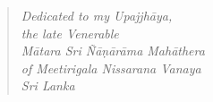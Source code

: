\cleartorecto
\thispagestyle{empty}

\mbox{}\vfill

\begin{verse}

{\itshape
Dedicated to my Upajjhāya,\\
the late Venerable\\
Mātara Sri Ñāṇārāma Mahāthera\\
of Meetirigala Nissarana Vanaya\\
Sri Lanka
}


\end{verse}

\vfill\mbox{}
